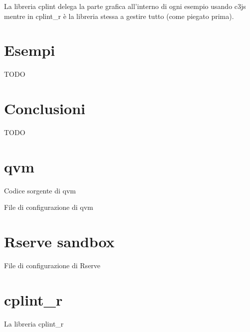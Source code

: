 \documentclass[10pt,titlepage,twoside,a4paper]{report}
\newenvironment{code}{\singlespacing\captionsetup{type=listing}}{}
\begin{document}
La libreria cplint delega la parte grafica all'interno di ogni esempio usando 
c3js mentre in cplint\_r è la libreria stessa a gestire tutto (come piegato 
prima).




\chapter{Esempi}

TODO



\chapter{Conclusioni}

TODO



\appendix

\chapter{qvm} \label{app:qvm}

    \begin{code}
        \caption{Codice sorgente di qvm}
    \end{code}

    \newpage

    \begin{code}
        \caption{File di configurazione di qvm}
    \end{code}




\chapter{Rserve sandbox} \label{app:rserve-sandbox}
    \begin{code}
        \caption{File di configurazione di Rserve}
    \end{code}

\chapter{cplint\_r} \label{app:cplint-r}
    \begin{code}
        \caption{La libreria cplint\_r}
    \end{code}





%

\end{document}
